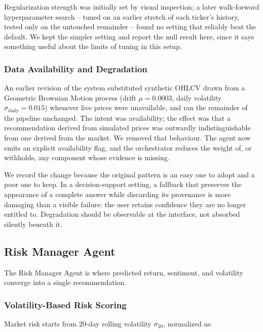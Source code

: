 \documentclass[conference]{IEEEtran}
\begin{document}
Regularization strength was initially set by visual inspection; a later walk-forward hyperparameter search -- tuned on an earlier stretch of each ticker's history, tested only on the untouched remainder -- found no setting that reliably beat the default. We kept the simpler setting and report the null result here, since it says something useful about the limits of tuning in this setup.

\subsubsection{Data Availability and Degradation}

An earlier revision of the system substituted synthetic OHLCV drawn from a Geometric Brownian Motion process (drift $\mu = 0.0003$, daily volatility $\sigma_{\mathrm{daily}} = 0.015$) whenever live prices were unavailable, and ran the remainder of the pipeline unchanged. The intent was availability; the effect was that a recommendation derived from simulated prices was outwardly indistinguishable from one derived from the market. We removed that behaviour. The agent now emits an explicit availability flag, and the orchestrator reduces the weight of, or withholds, any component whose evidence is missing.

We record the change because the original pattern is an easy one to adopt and a poor one to keep. In a decision-support setting, a fallback that preserves the appearance of a complete answer while discarding its provenance is more damaging than a visible failure: the user retains confidence they are no longer entitled to. Degradation should be observable at the interface, not absorbed silently beneath it.

\subsection{Risk Manager Agent}

The Risk Manager Agent is where predicted return, sentiment, and volatility converge into a single recommendation.

\subsubsection{Volatility-Based Risk Scoring}

Market risk starts from 20-day rolling volatility $\sigma_{20}$, normalized as:
\end{document}
